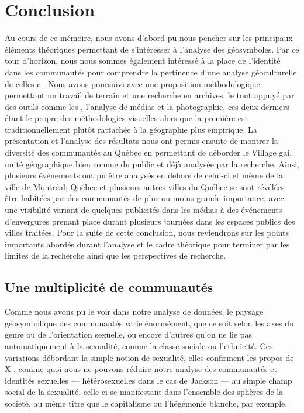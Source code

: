 \chapter*{Conclusion}

Au cours de ce mémoire, nous avons d'abord pu nous pencher sur les principaux éléments théoriques permettant de s'intéresser à l'analyse des géosymboles.
Par ce tour d'horizon, nous nous sommes également intéressé à la place de l'identité dans les communautés \lgbt{} pour comprendre la pertinence d'une analyse géoculturelle de celles-ci.
Nous avons poursuivi avec une proposition méthodologique permettant un travail de terrain et une recherche en archives, le tout appuyé par des outils comme les \sig{}, l'analyse de médias et la photographie, ces deux derniers étant le propre des méthodologies visuelles alors que la première est traditionnellement plutôt rattachée à la géographie plus empirique.
La présentation et l'analyse des résultats nous ont permis ensuite de montrer la diversité des communautés \lgbt{} au Québec en permettant de déborder le Village gai, unité géographique bien connue du public et déjà analysée par la recherche.
Ainsi, plusieurs événements ont pu être analysés en dehors de celui-ci et même de la ville de Montréal; Québec et plusieurs autres villes du Québec se sont révélées être habitées par des communautés \lgbt{} de plus ou moins grande importance, avec une visibilité variant de quelques publicités dans les médias \lgbt à des événements d'envergures prenant place durant plusieurs journées dans les espaces publics des villes traitées.
Pour la suite de cette conclusion, nous reviendrons sur les points importants abordés durant l'analyse et le cadre théorique pour terminer par les limites de la recherche ainsi que les perspectives de recherche.

\section{Une multiplicité de communautés}
\label{sec:une_multiplicite_de_communautes}

Comme nous avons pu le voir dans notre analyse de données, le paysage géosymbolique des communautés \lgbt{} varie énormément, que ce soit selon les axes du genre ou de l'orientation sexuelle, ou encore d'autres qu'on ne lie pas automatiquement à la sexualité, comme la classe sociale ou l'ethnicité.
Ces variations débordant la simple notion de sexualité, elles confirment les propos de X , comme quoi nous ne pouvons réduire notre analyse des communautés et identités sexuelles --- hétérosexuelles dans le cas de Jackson --- au simple champ social de la sexualité, celle-ci se manifestant dans l'ensemble des sphères de la société, au même titre que le capitalisme ou l'hégémonie blanche, par exemple.

